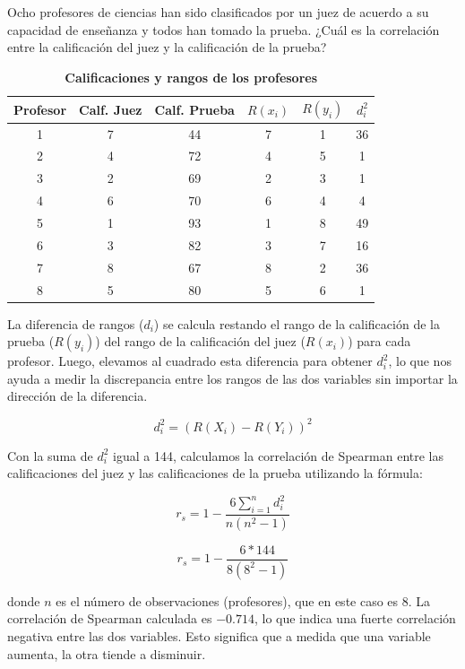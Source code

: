 \documentclass{article}
\begin{document}
Ocho profesores de ciencias han sido clasificados por un juez de acuerdo a su capacidad de enseñanza y todos han tomado la prueba. ¿Cuál es la correlación entre la calificación del juez y la calificación de la prueba?

\begin{table}[ht]
    \centering
    \caption{\textbf{Calificaciones y rangos de los profesores}}
    \begin{tabular}{cccccc}
        \toprule
        Profesor & Calf. Juez & Calf. Prueba & $R(x_i)$ & $R(y_i)$ & $d_i^2$ \\
        \midrule
        1        & 7          & 44           & 7        & 1        & 36      \\
        2        & 4          & 72           & 4        & 5        & 1       \\
        3        & 2          & 69           & 2        & 3        & 1       \\
        4        & 6          & 70           & 6        & 4        & 4       \\
        5        & 1          & 93           & 1        & 8        & 49      \\
        6        & 3          & 82           & 3        & 7        & 16      \\
        7        & 8          & 67           & 8        & 2        & 36      \\
        8        & 5          & 80           & 5        & 6        & 1       \\
        \bottomrule
    \end{tabular}
\end{table}

La diferencia de rangos (\(d_i\)) se calcula restando el rango de la calificación de la prueba (\(R(y_i)\)) del rango de la calificación del juez (\(R(x_i)\)) para cada profesor. Luego, elevamos al cuadrado esta diferencia para obtener \(d_i^2\), lo que nos ayuda a medir la discrepancia entre los rangos de las dos variables sin importar la dirección de la diferencia.

\[d_i^2 = (R(X_i) - R(Y_i))^2\]

Con la suma de $d_i^2$ igual a 144, calculamos la correlación de Spearman entre las calificaciones del juez y las calificaciones de la prueba utilizando la fórmula:


\[r_s = 1 - \frac{6 \sum_{i=1}^{n}d_i^2}{n(n^2 - 1)}\]

\[r_s = 1 - \frac{6 * 144}{8(8^2 - 1)}\]

donde $n$ es el número de observaciones (profesores), que en este caso es 8. La correlación de Spearman calculada es $-0.714$, lo que indica una fuerte correlación negativa entre las dos variables. Esto significa que a medida que una variable aumenta, la otra tiende a disminuir.
\end{document}
